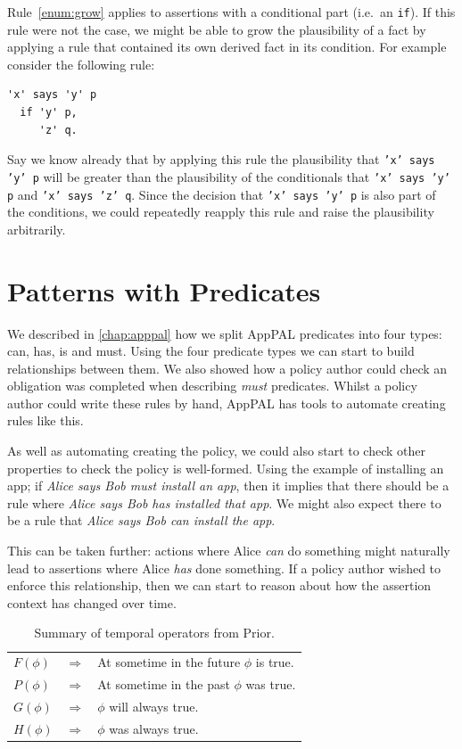 \documentclass[thesis.tex]{subfiles}
\begin{document}
Rule~\ref{enum:grow} applies to assertions with a conditional part (i.e.~an
\texttt{if}). If this rule were not the case, we might be able to grow the
plausibility of a fact by applying a rule that contained its own derived fact in
its condition. For example consider the following rule:
\begin{lstlisting}
'x' says 'y' p
  if 'y' p,
     'z' q.
\end{lstlisting} Say we know already that by applying this rule the plausibility
that \texttt{'x' says 'y' p} will be greater than the plausibility of the
conditionals that \texttt{'x' says 'y' p} and \texttt{'x' says 'z' q}. Since the
decision that \texttt{'x' says 'y' p} is also part of the conditions, we could
repeatedly reapply this rule and raise the plausibility arbitrarily.

\section{Patterns with Predicates}
\label{sec:patterns-with-predicates}

We described in \autoref{chap:apppal} how we split AppPAL predicates into four types: can, has, is and must.
Using the four predicate types we can start to build relationships between them.
We also showed how a policy author could check an obligation was completed when
describing \emph{must} predicates.  Whilst a policy author could write these
rules by hand, AppPAL has tools to automate creating rules like this.

As well as automating creating the policy, we could also start to check other
properties to check the policy is well-formed. Using the example of installing
an app; if \emph{Alice says Bob must install
  an app}, then it implies that there should be a rule where \emph{Alice says
Bob has installed that app}.  We might also expect there to be a rule that
\emph{Alice says Bob can install the app}.

This can be taken further: actions where Alice \emph{can} do something might
naturally lead to assertions where Alice \emph{has} done something.  If a policy
author wished to enforce this relationship, then we can start to reason about how the
assertion context has changed over time.

\begin{table}\centering
 \begin{tabular}{l c l}
   \toprule
     $F(\phi)$ & $\Rightarrow$ & At sometime in the future $\phi$ is true. \\
     $P(\phi)$ & $\Rightarrow$ & At sometime in the past $\phi$ was true. \\
     $G(\phi)$ & $\Rightarrow$ & $\phi$ will always true. \\
     $H(\phi)$ & $\Rightarrow$ & $\phi$ was always true. \\
   \bottomrule
 \end{tabular}
 \caption{Summary of temporal operators from Prior.}
 \label{tab:temporal-operators}
\end{table}
\end{document}

